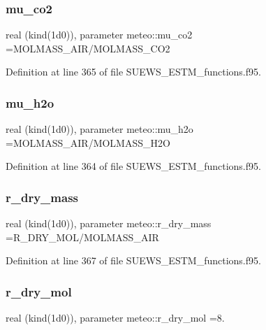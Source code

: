 \subsubsection{\texorpdfstring{mu\+\_\+co2}{mu\_co2}}
{\footnotesize\ttfamily real (kind(1d0)), parameter meteo\+::mu\+\_\+co2 =M\+O\+L\+M\+A\+S\+S\+\_\+\+A\+IR/M\+O\+L\+M\+A\+S\+S\+\_\+\+C\+O2}



Definition at line 365 of file S\+U\+E\+W\+S\+\_\+\+E\+S\+T\+M\+\_\+functions.\+f95.

\mbox{\label{namespacemeteo_ac6780e7f2432c338fc92d3ef2eca5089}} 
\subsubsection{\texorpdfstring{mu\+\_\+h2o}{mu\_h2o}}
{\footnotesize\ttfamily real (kind(1d0)), parameter meteo\+::mu\+\_\+h2o =M\+O\+L\+M\+A\+S\+S\+\_\+\+A\+IR/M\+O\+L\+M\+A\+S\+S\+\_\+\+H2O}



Definition at line 364 of file S\+U\+E\+W\+S\+\_\+\+E\+S\+T\+M\+\_\+functions.\+f95.

\mbox{\label{namespacemeteo_aeb38e2ee75a5100806164ecfd458a956}} 
\subsubsection{\texorpdfstring{r\+\_\+dry\+\_\+mass}{r\_dry\_mass}}
{\footnotesize\ttfamily real (kind(1d0)), parameter meteo\+::r\+\_\+dry\+\_\+mass =R\+\_\+\+D\+R\+Y\+\_\+\+M\+OL/M\+O\+L\+M\+A\+S\+S\+\_\+\+A\+IR}



Definition at line 367 of file S\+U\+E\+W\+S\+\_\+\+E\+S\+T\+M\+\_\+functions.\+f95.

\mbox{\label{namespacemeteo_a6b0124b140e3a372291310b9c292ceda}} 
\subsubsection{\texorpdfstring{r\+\_\+dry\+\_\+mol}{r\_dry\_mol}}
{\footnotesize\ttfamily real (kind(1d0)), parameter meteo\+::r\+\_\+dry\+\_\+mol =8.}



